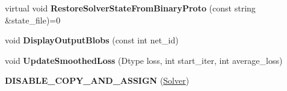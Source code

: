 \begin{DoxyCompactItemize}
\item 
\mbox{\label{classcaffe_1_1_solver_ab532eca6ca2b9c8e9374ed8c582f7957}} 
virtual void {\bfseries Restore\+Solver\+State\+From\+Binary\+Proto} (const string \&state\+\_\+file)=0
\item 
\mbox{\label{classcaffe_1_1_solver_a321a24e0422c6f95895f57ed9732192a}} 
void {\bfseries Display\+Output\+Blobs} (const int net\+\_\+id)
\item 
\mbox{\label{classcaffe_1_1_solver_af38477c3d0e124de6eb989629cc4f62f}} 
void {\bfseries Update\+Smoothed\+Loss} (Dtype loss, int start\+\_\+iter, int average\+\_\+loss)
\item 
\mbox{\label{classcaffe_1_1_solver_a3d7a623b6aa51f7971942d376652924f}} 
{\bfseries D\+I\+S\+A\+B\+L\+E\+\_\+\+C\+O\+P\+Y\+\_\+\+A\+N\+D\+\_\+\+A\+S\+S\+I\+GN} (\mbox{\hyperlink{classcaffe_1_1_solver}{Solver}})
\end{DoxyCompactItemize}

